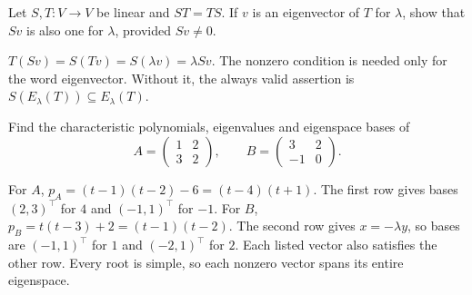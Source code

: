 \begin{problem}\label{ex:08:commuting-space}
Let \(S,T:V\to V\) be linear and \(ST=TS\).
If \(v\) is an eigenvector of \(T\) for \(\lambda\), show that \(Sv\)
is also one for \(\lambda\), provided \(Sv\ne0\).
\end{problem}
\begin{solution}
\(T(Sv)=S(Tv)=S(\lambda v)=\lambda Sv\).
The nonzero condition is needed only for the word eigenvector.
Without it, the always valid assertion is \(S(E_\lambda(T))\subseteq
E_\lambda(T)\).
\end{solution}

\begin{problem}\label{ex:08:lang-two}
Find the characteristic polynomials, eigenvalues and eigenspace bases of
\[
 A=\begin{pmatrix}1&2\\3&2\end{pmatrix},\qquad
 B=\begin{pmatrix}3&2\\-1&0\end{pmatrix}.
\]
\end{problem}
\begin{solution}
For \(A\), \(p_A=(t-1)(t-2)-6=(t-4)(t+1)\).
The first row gives bases \((2,3)^\top\) for \(4\) and
\((-1,1)^\top\) for \(-1\).
For \(B\), \(p_B=t(t-3)+2=(t-1)(t-2)\).
The second row gives \(x=-\lambda y\), so bases are
\((-1,1)^\top\) for \(1\) and \((-2,1)^\top\) for \(2\).
Each listed vector also satisfies the other row.
Every root is simple, so each nonzero vector spans its entire eigenspace.
\end{solution}

